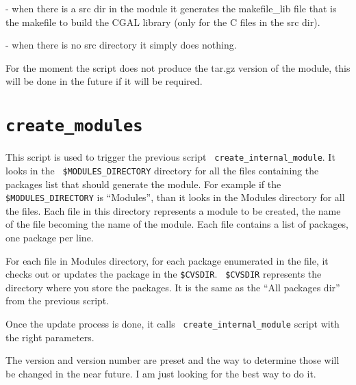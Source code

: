 - when there is a src dir in the module it generates the makefile\_lib
file that is the makefile to build the CGAL library (only for the C
files in the src dir).

  - when there is no src directory it simply does nothing.
  
  For the moment the script does not produce the tar.gz version of the
  module, this will be done in the future if it will be required.
  


\section{{\tt create\_modules}}
\label{sec:create_modules}

This script is used to trigger the previous script {\tt
  create\_internal\_module}. It looks in the {\tt
  \$MODULES\_DIRECTORY} directory for all the files containing the
packages list that should generate the module. For example if the {\tt
  \$MODULES\_DIRECTORY} is ``Modules'', than it looks in the Modules
directory for all the files. Each file in this directory represents a
module to be created, the name of the file becoming the name of the
module. Each file contains a list of packages, one package per line.

For each file in Modules directory, for each package enumerated in the
file, it checks out or updates the package in the {\tt \$CVSDIR}. {\tt
  \$CVSDIR} represents the directory where you store the packages. It
is the same as the ``All packages dir'' from the previous script.

Once the update process is done, it calls {\tt
  create\_internal\_module} script with the right parameters.

The version and version number are preset and the way to determine
those will be changed in the near future. I am just looking for the
best way to do it.
  


